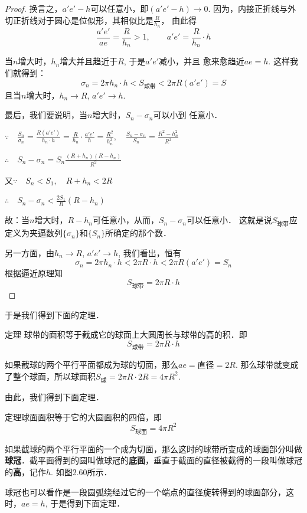 \begin{proof}
换言之，$a'e'-h$可以任意小，即$(a'e'-h)\to 0$. 因为，内接正折线与外切正折线对于圆心是位似形，其相似比是$\frac{R}{h_n}$，
由此得
\[\frac{a'e'}{ae}=\frac{R}{h_n}>1,\qquad a'e'=\frac{R}{h_n}\cdot h\]

当$n$增大时，$h_n$增大并且趋近于$R$, 于是$a'e'$减小，并且
愈来愈趋近$ae=h$. 这样我们就得到：
\[\sigma_n=2\pi h_n\cdot h<S_{\text{球带}}<2\pi R(a'e')=S\]
且当$n$增大时，$h_n\to R$, $a'e'\to h$.

最后，我们要说明，当$n$增大时，$S_n-\sigma_n$可以小到
任意小．

$\because\quad \frac{S_n}{\sigma_n}=\frac{R(a'e')}{h_n\cdot h}=\frac{R}{h_n}\cdot \frac{a'e'}{h}=\frac{R^2}{h^2_n},\quad \frac{S_n-\sigma_n}{S_n}=\frac{R^2-h^2_n}{R^2}$

$\therefore\quad S_n-\sigma_n=S_n\frac{(R+h_n) (R-h_n)}{R^2}$

又$\because\quad S_n<S_1,\quad R+h_n<2R$

$\therefore\quad S_n-\sigma_n<\frac{2S_1}{R}(R-h_n)$

故：当$n$增大时，$R-h_n$可任意小，从而，$S_n -\sigma_n$可以任意小．
这就是说$S_{\text{球带}}$应定义为夹逼数列$\{\sigma_n\}$和$\{S_n \}$所确定的那个数．

另一方面，由$h_n\to R$, $a'e'\to h$, 我们看出，恒有
\[\sigma_n=2\pi h_n\cdot h<2\pi R\cdot h<2\pi R (a'e') =S_n\]
根据逼近原理知
$$S_{\text{球带}}=2\pi R\cdot h$$
\end{proof}

于是我们得到下面的定理．

\begin{blk}
    {定理} 球带的面积等于截成它的球面上大圆周长与球带的高的积．即
\[S_{\text{球带}}=2\pi R\cdot h\]
\end{blk}

如果截球的两个平行平面都成为球的切面，那么$ae=$直径$=2R$. 那么球带就变成了整个球面，所以球面积$S_{\text{球}}=2\pi R\cdot 2R=4\pi R^2$.

由此，我们得到下面定理．

\begin{blk}
    {定理}球面面积等于它的大圆面积的四倍，即
\[S_{\text{球面}}=4\pi R^2\]
\end{blk}

如果截球的两个平行平面的一个成为切面，那么这时的球带所变成的球面部分叫做\textbf{球冠}．截平面得到的圆叫做球冠的\textbf{底面}，垂直于截面的直径被截得的一段叫做球冠的\textbf{高}，记作$h$. 如图2.60所示．

球冠也可以看作是一段圆弧绕经过它的一个端点的直径旋转得到的球面部分，这时，$ae=h$, 于是得到下面定理．


